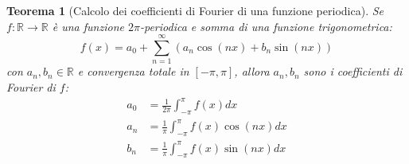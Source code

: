 \documentclass[12pt, a4paper]{article}
\theoremstyle{break}
\newtheorem{theorem}{Teorema} %
\begin{document}
\newpage
\begin{theorem} [Calcolo dei coefficienti di Fourier di una funzione periodica]
	Se $f: \mathbb{R} \to \mathbb{R}$ è una funzione $2\pi$-periodica e
	somma di una funzione trigonometrica:
	\[
		f(x) = a_0 + \sum_{n=1}^{\infty} (a_n \cos(nx) + b_n \sin(nx))
	\]
	con $a_n, b_n \in \mathbb{R}$ e convergenza totale in $[-\pi,\pi]$,
	allora $a_n, b_n$ sono i coefficienti di Fourier di $f$:
	\begin{align*}
		a_0 & = \frac{1}{2\pi} \int_{-\pi}^{\pi} f(x) dx         \\
		a_n & = \frac{1}{\pi} \int_{-\pi}^{\pi} f(x) \cos(nx) dx \\
		b_n & = \frac{1}{\pi} \int_{-\pi}^{\pi} f(x) \sin(nx) dx \\
	\end{align*}
\end{theorem}
\end{document}
